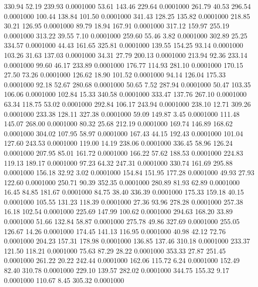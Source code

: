  330.94   52.19  239.93   0.0001000
  53.61  143.46  229.64   0.0001000
 261.79   40.53  296.54   0.0001000
 100.44  138.84  101.50   0.0001000
 341.43  128.25  135.82   0.0001000
 218.85   30.21  126.95   0.0001000
  89.79   18.94  167.91   0.0001000
 317.12  159.97  255.19   0.0001000
 313.22   39.55    7.10   0.0001000
 259.60   55.46    3.82   0.0001000
 302.89   25.25  334.57   0.0001000
  44.43  161.65  325.81   0.0001000
 139.55  154.25   93.14   0.0001000
 103.26   31.63  137.03   0.0001000
  34.31   27.79  200.13   0.0001000
 213.94   92.36  233.14   0.0001000
  99.60   46.17  233.89   0.0001000
 176.77  114.93  281.10   0.0001000
 170.15   27.50   73.26   0.0001000
 126.62   18.90  101.52   0.0001000
  94.14  126.04  175.33   0.0001000
  92.18   52.67  280.68   0.0001000
  50.65    7.52  287.94   0.0001000
  50.47  103.35  106.06   0.0001000
 102.84   15.33  340.58   0.0001000
 333.47  137.76  267.10   0.0001000
  63.34  118.75   53.02   0.0001000
 292.84  106.17  243.94   0.0001000
 238.10   12.71  309.26   0.0001000
 233.38  128.11  327.38   0.0001000
  59.09  149.87    3.45   0.0001000
 111.48  145.07  268.00   0.0001000
  80.32   25.68  212.19   0.0001000
 169.74  146.89  168.62   0.0001000
 304.02  107.95   58.97   0.0001000
 167.43   44.15  192.43   0.0001000
 101.04  127.60  243.53   0.0001000
 119.00   14.19  238.06   0.0001000
 336.45   58.96  126.24   0.0001000
 207.95   85.01  161.72   0.0001000
 166.22   57.62  188.53   0.0001000
 224.83  119.13  189.17   0.0001000
  97.23   64.32  247.31   0.0001000
 330.74  161.69  295.88   0.0001000
 156.18   32.92    3.02   0.0001000
 154.84  151.95  177.28   0.0001000
  49.93   27.93  122.60   0.0001000
 250.71   90.39  352.35   0.0001000
 280.89   81.93   62.89   0.0001000
  16.45   84.85  181.67   0.0001000
  84.75   38.40  336.39   0.0001000
 175.33  159.18   40.15   0.0001000
 105.55  131.23  118.39   0.0001000
  27.36   93.96  278.28   0.0001000
 257.38   16.18  102.54   0.0001000
 225.69  147.99  100.62   0.0001000
 294.63  168.20   33.89   0.0001000
  51.66  132.84   58.87   0.0001000
 275.78   49.86  327.69   0.0001000
 255.05  126.67   14.26   0.0001000
 174.45  141.13  116.95   0.0001000
  40.98   42.12   72.76   0.0001000
 204.23  157.31  178.98   0.0001000
 136.85  137.46  310.18   0.0001000
 233.37  121.50  118.21   0.0001000
  75.63   87.29   28.22   0.0001000
 353.33   27.87  251.45   0.0001000
 261.22   20.22  242.44   0.0001000
 162.06  115.72    6.24   0.0001000
 152.49   82.40  310.78   0.0001000
 229.10  139.57  282.02   0.0001000
 344.75  155.32    9.17   0.0001000
 110.67    8.45  305.32   0.0001000
